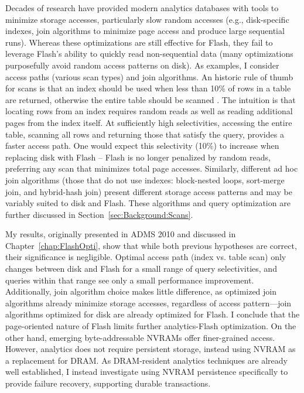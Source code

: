 Decades of research have provided modern analytics databases with tools to minimize storage accesses, particularly slow random accesses (e.g., disk-specific indexes, join algorithms to minimize page access and produce large sequential runs).
Whereas these optimizations are still effective for Flash, they fail to leverage Flash's ability to quickly read non-sequential data (many optimizations purposefully avoid random access patterns on disk).
As examples, I consider access paths (various scan types) and join algorithms.
An historic rule of thumb for scans is that an index should be used when less than 10\% of rows in a table are returned, otherwise the entire table should be scanned \cite{RamakrishnanAndGehrke}.
The intuition is that locating rows from an index requires random reads as well as reading additional pages from the index itself.
At sufficiently high selectivities, accessing the entire table, scanning all rows and returning those that satisfy the query, provides a faster access path.
One would expect this selectivity (10\%) to increase when replacing disk with Flash -- Flash is no longer penalized by random reads, preferring any scan that minimizes total page accesses.
Similarly, different ad hoc join algorithms (those that do not use indexes: block-nested loops, sort-merge join, and hybrid-hash join) present different storage access patterns and may be variably suited to disk and Flash.
These algorithms and query optimization are further discussed in Section~\ref{sec:Background:Scans}.

My results, originally presented in ADMS 2010 \cite{PelleyWenisch11} and discussed in Chapter~\ref{chap:FlashOpti}, show that while both previous hypotheses are correct, their significance is negligible.
Optimal access path (index vs. table scan) only changes between disk and Flash for a small range of query selectivities, and queries within that range see only a small performance improvement.
Additionally, join algorithm choice makes little difference, as optimized join algorithms already minimize storage accesses, regardless of access pattern---join algorithms optimized for disk are already optimized for Flash.
I conclude that the page-oriented nature of Flash limits further analytics-Flash optimization.
On the other hand, emerging byte-addressable NVRAMs offer finer-grained access.
However, analytics does not require persistent storage, instead using NVRAM as a replacement for DRAM.
As DRAM-resident analytics techniques are already well established, I instead investigate using NVRAM persistence specifically to provide failure recovery, supporting durable transactions.

